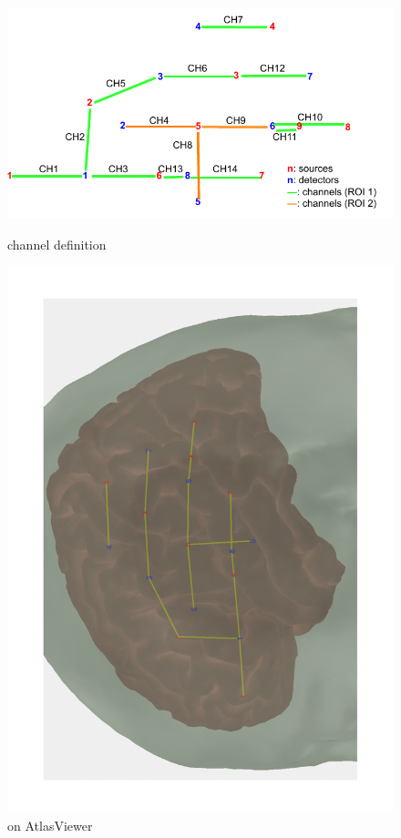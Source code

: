 \begin{figure}[H]
\centering
\begin{minipage}[c]{.75\linewidth}
  \centering
  \includegraphics[scale= 0.78, origin= c]{pdf/optode_template_roi.pdf}
  \caption{channel definition}
\end{minipage} \hfill
\begin{minipage}[c]{.22\linewidth}
  \centering
  \includegraphics[scale= 0.2, angle = -90, origin= c] {pdf/atlas_optode_template}
  \caption{on AtlasViewer}
  \label{fig:test2}
\end{minipage}
\end{figure}


